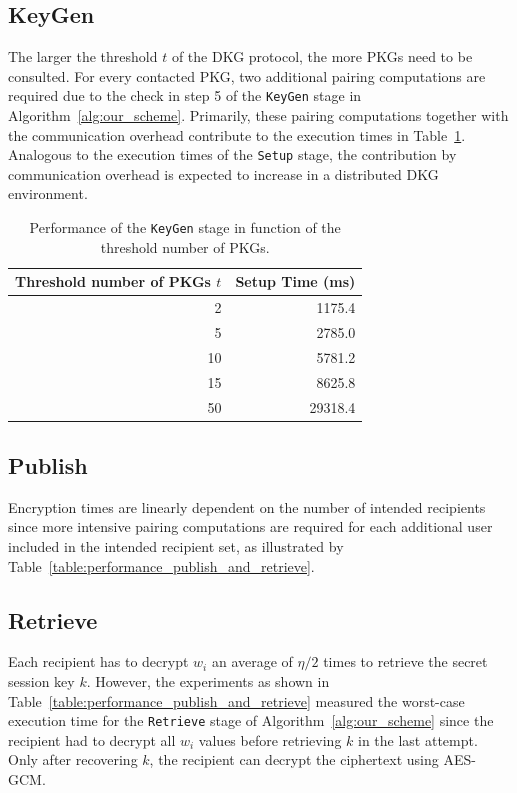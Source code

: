 \subsection{KeyGen}
The larger the threshold $t$ of the DKG protocol, the more PKGs need to be consulted. For every contacted PKG, two additional pairing computations are required due to the check in step 5 of the \texttt{KeyGen} stage in Algorithm~\ref{alg:our_scheme}. Primarily, these pairing computations together with the communication overhead contribute to the execution times in Table~\ref{table:performance_keygen}. Analogous to the execution times of the \texttt{Setup} stage, the contribution by communication overhead is expected to increase in a distributed DKG environment. 

\begin{table}
  \centering
  \begin{tabular}{@{}rr@{}} \toprule
    Threshold number of PKGs $t$ & Setup Time (ms) \\ \midrule
    2 & 1175.4 \\
    5 & 2785.0 \\
    10 & 5781.2 \\
    15 & 8625.8 \\ 
    50 & 29318.4 \\ \bottomrule
  \end{tabular}
  \caption{Performance of the \texttt{KeyGen} stage in function of the threshold number of PKGs.}
  \label{table:performance_keygen}
\end{table}

\subsection{Publish}
Encryption times are linearly dependent on the number of intended recipients since more intensive pairing computations are required for each additional user included in the intended recipient set, as illustrated by Table~\ref{table:performance_publish_and_retrieve}.

\subsection{Retrieve}
Each recipient has to decrypt $w_i$ an average of $\eta/2$ times to retrieve the secret session key $k$. However, the experiments as shown in Table~\ref{table:performance_publish_and_retrieve} measured the worst-case execution time for the \texttt{Retrieve} stage of Algorithm~\ref{alg:our_scheme} since the recipient had to decrypt all $w_i$ values before retrieving $k$ in the last attempt. Only after recovering $k$, the recipient can decrypt the ciphertext using AES-GCM.

